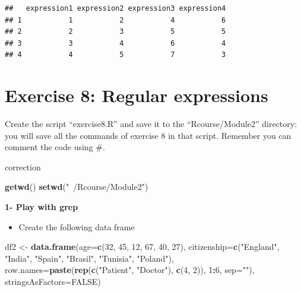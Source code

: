 \documentclass[]{book}
\newenvironment{Shaded}{\begin{snugshade}}{\end{snugshade}}
\newcommand{\DataTypeTok}[1]{\textcolor[rgb]{0.13,0.29,0.53}{#1}}
\newcommand{\DecValTok}[1]{\textcolor[rgb]{0.00,0.00,0.81}{#1}}
\newcommand{\KeywordTok}[1]{\textcolor[rgb]{0.13,0.29,0.53}{\textbf{#1}}}
\newcommand{\NormalTok}[1]{#1}
\newcommand{\OperatorTok}[1]{\textcolor[rgb]{0.81,0.36,0.00}{\textbf{#1}}}
\newcommand{\OtherTok}[1]{\textcolor[rgb]{0.56,0.35,0.01}{#1}}
\newcommand{\StringTok}[1]{\textcolor[rgb]{0.31,0.60,0.02}{#1}}
\providecommand{\tightlist}{%
  \setlength{\itemsep}{0pt}\setlength{\parskip}{0pt}}
\begin{document}
\begin{verbatim}
##   expression1 expression2 expression3 expression4
## 1           1           2           4           6
## 2           2           3           5           5
## 3           3           4           6           4
## 4           4           5           7           3
\end{verbatim}

\hypertarget{exercise-8-regular-expressions}{%
\section{Exercise 8: Regular expressions}\label{exercise-8-regular-expressions}}

Create the script ``exercise8.R'' and save it to the ``Rcourse/Module2'' directory: you will save all the commands of exercise 8 in that script.
Remember you can comment the code using \#.

correction

\begin{Shaded}
\begin{Highlighting}[]
\KeywordTok{getwd}\NormalTok{()}
\KeywordTok{setwd}\NormalTok{(}\StringTok{"~/Rcourse/Module2"}\NormalTok{)}
\end{Highlighting}
\end{Shaded}

\textbf{1- Play with grep}

\begin{itemize}
\tightlist
\item
  Create the following data frame
\end{itemize}

\begin{Shaded}
\begin{Highlighting}[]
\NormalTok{df2 <-}\StringTok{ }\KeywordTok{data.frame}\NormalTok{(}\DataTypeTok{age=}\KeywordTok{c}\NormalTok{(}\DecValTok{32}\NormalTok{, }\DecValTok{45}\NormalTok{, }\DecValTok{12}\NormalTok{, }\DecValTok{67}\NormalTok{, }\DecValTok{40}\NormalTok{, }\DecValTok{27}\NormalTok{), }
    \DataTypeTok{citizenship=}\KeywordTok{c}\NormalTok{(}\StringTok{"England"}\NormalTok{, }\StringTok{"India"}\NormalTok{, }\StringTok{"Spain"}\NormalTok{, }\StringTok{"Brasil"}\NormalTok{, }\StringTok{"Tunisia"}\NormalTok{, }\StringTok{"Poland"}\NormalTok{), }
    \DataTypeTok{row.names=}\KeywordTok{paste}\NormalTok{(}\KeywordTok{rep}\NormalTok{(}\KeywordTok{c}\NormalTok{(}\StringTok{"Patient"}\NormalTok{, }\StringTok{"Doctor"}\NormalTok{), }\KeywordTok{c}\NormalTok{(}\DecValTok{4}\NormalTok{, }\DecValTok{2}\NormalTok{)), }\DecValTok{1}\OperatorTok{:}\DecValTok{6}\NormalTok{, }\DataTypeTok{sep=}\StringTok{""}\NormalTok{),}
    \DataTypeTok{stringsAsFactors=}\OtherTok{FALSE}\NormalTok{)}
\end{Highlighting}
\end{Shaded}
\end{document}
